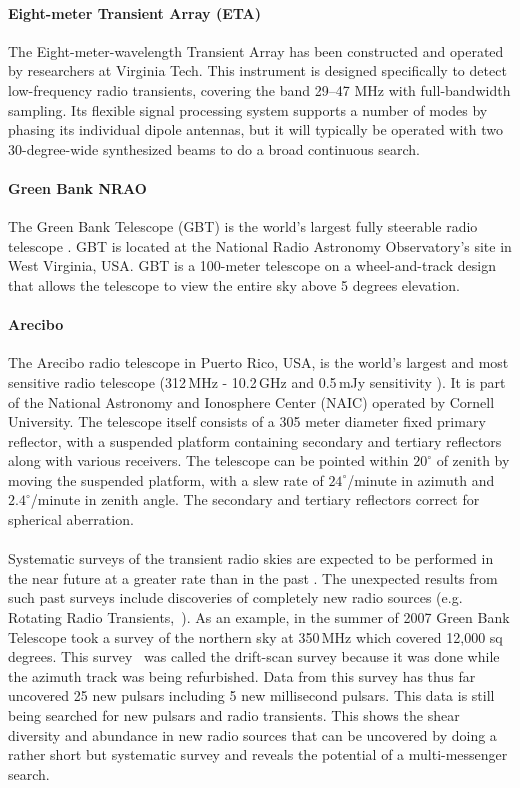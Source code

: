 \paragraph{Eight-meter Transient Array (ETA)} 
The Eight-meter-wavelength Transient Array \cite{Patterson:2008ie} has been
constructed and operated by researchers at Virginia Tech.  This
instrument is designed specifically to detect low-frequency radio
transients, covering the band 29--47 MHz with full-bandwidth sampling.  Its
flexible signal processing system supports a number of modes by phasing
its individual dipole antennas, but it will typically be operated with
two 30-degree-wide synthesized beams to do a broad continuous search.

\paragraph{Green Bank NRAO} 
The Green Bank Telescope (GBT) is the world's largest fully steerable
radio telescope \cite{Mason:2009dq}. GBT is located at the National Radio Astronomy
Observatory's site in West Virginia, USA. GBT is a 100-meter telescope
on a wheel-and-track design that allows the telescope to view the entire
sky above 5 degrees elevation.  

\paragraph{Arecibo}
The Arecibo radio telescope in Puerto Rico, USA, is the world's largest
and most sensitive radio telescope (312\,MHz - 10.2\,GHz and 0.5\,mJy
sensitivity \cite{Lommen:2000yt}).  It is part of the National Astronomy and Ionosphere
Center (NAIC) operated by Cornell University.  The telescope itself
consists of a 305 meter diameter fixed primary reflector, with a
suspended platform containing secondary and tertiary reflectors along
with various receivers.  The telescope can be pointed within $20^\circ$
of zenith by moving the suspended platform, with a slew rate of
$24^\circ$/minute in azimuth and $2.4^\circ$/minute in zenith angle.
The secondary and tertiary reflectors correct for spherical aberration.

\paragraph{}
Systematic surveys of the transient radio skies are expected to be performed in the near future at a greater rate than in the past \cite{Lazio:2009xe}. The unexpected results from such past surveys include discoveries of completely new radio sources (e.g. Rotating Radio Transients,~\cite{BurkeSpolaor:2009rm}). 
As an example, in the summer of 2007 Green Bank Telescope took a survey of the
northern sky at 350\,MHz which covered 12,000 sq degrees. This survey~\cite{Hessels:2007ct} was
called the drift-scan survey because it was done while the azimuth track
was being refurbished. Data from this survey has thus far uncovered 25
new pulsars including 5 new millisecond pulsars.  This data is still
being searched for new pulsars and radio transients. This shows the
shear diversity and abundance in new radio sources that can be uncovered
by doing a rather short but systematic survey and reveals the potential
of a multi-messenger search. 

